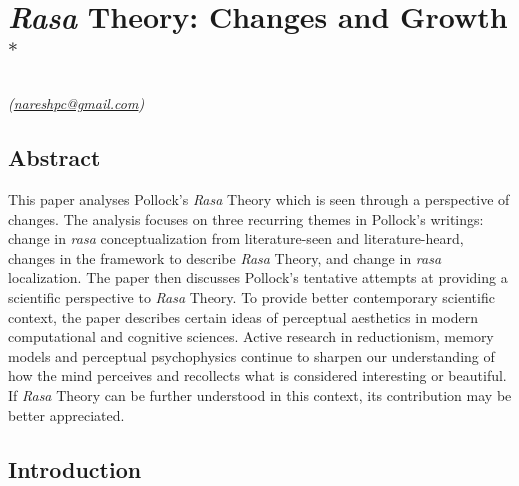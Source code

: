 \chapter[\textsl{Rasa} Theory: Changes and Growth]{\textsl{Rasa} Theory: Changes and Growth$^{*}$}\label{chapter\thechapter:begin}

\hfill{\sl(\url{nareshpc@gmail.com})}


\section*{Abstract}

This paper analyses Pollock’s \textsl{Rasa} Theory which is seen through a perspective of changes. The analysis focuses on three recurring themes in Pollock's writings: change in \textsl{rasa} conceptualization from literature-seen and literature-heard, changes in the framework to describe \textsl{Rasa} Theory, and change in \textsl{rasa} localization. The paper then discusses Pollock’s tentative attempts at providing a scientific perspective to \textsl{Rasa} Theory. To provide better contemporary scientific context, the paper describes certain ideas of perceptual aesthetics in modern computational and cognitive sciences. Active research in reductionism, memory models and perceptual psychophysics continue to sharpen our understanding of how the mind perceives and recollects what is considered interesting or beautiful. If \textsl{Rasa} Theory can be further understood in this context, its contribution may be better appreciated. 

\section*{Introduction}

